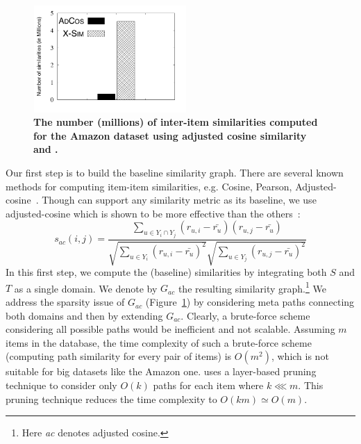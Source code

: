 \begin{figure}
\begin{center}
\vspace{-3mm}
\includegraphics[height=1.6in,width=2.3in]{figures/Total_Sim.pdf}
\vspace{-6mm}
\caption{{\bf The number (millions) of inter-item similarities computed for the Amazon dataset using adjusted cosine similarity and \graphsim.}}
\label{fig:simCount}
\end{center}
\end{figure}

 Our first step is to build the baseline similarity graph. There are several known methods for computing item-item similarities, e.g. Cosine, Pearson, Adjusted-cosine~\cite{sarwar2001item}. Though \graphsim can support any similarity metric as its baseline, we use adjusted-cosine which is shown to be more effective than the others~\cite{sarwar2001item}:
\begin{equation}
s_{ac}(i,j)=\frac{\sum _{u \in Y_i \cap Y_j} (r_{u,i} - \bar{r_u})(r_{u,j} - \bar{r_u})}{\sqrt{\sum _{u \in Y_i} (r_{u,i} - \bar{r_u})^2}\sqrt{\sum _{u \in Y_j} (r_{u,j} - \bar{r_u})^2}}
\label{adcos}
\end{equation}
In this first step, we compute the (baseline) similarities by integrating both $S$ and $T$ as a single domain. We denote by $G_{ac}$ the resulting similarity graph.\footnote{Here \emph{ac} denotes adjusted cosine.} We address the sparsity issue of $G_{ac}$ (Figure~\ref{fig:simCount}) by considering meta paths connecting both domains and then by extending $G_{a c}$. Clearly, a brute-force scheme considering all possible paths would be inefficient and not scalable. Assuming $m$ items in the database, the time complexity of such a brute-force scheme (computing path similarity for every pair of items) is $O(m^2)$, which is not suitable for big datasets like the Amazon one. \crossrec uses a layer-based pruning technique to consider only $O(k)$ paths for each item where $k \lll  m$. This pruning technique reduces the time complexity to $O(km) \simeq O(m)$.


